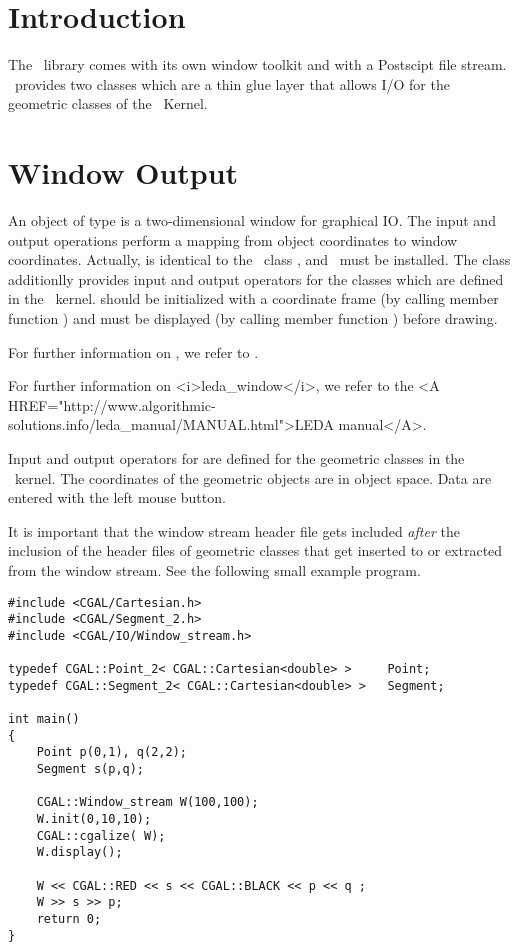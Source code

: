 \ccParDims

\section{Introduction}

The \leda\ library comes with its own window toolkit and with a
Postscipt file stream. \cgal\ provides two classes 
   
which  are a thin glue layer that allows I/O for the geometric 
classes of the \cgal\ Kernel.


\section{Window Output}

An object of type  is a two-dimensional window for
graphical IO. The input and output operations perform a mapping from
object coordinates to window coordinates.
Actually,  is identical to the \leda\ class ,
and \leda\ must be installed. The class additionlly provides input and output 
operators for the classes which are defined in the \cgal\ kernel.
 should be initialized with a coordinate frame 
(by calling member function
) and must be displayed (by calling member function ) before
drawing.

\begin{ccTexOnly}
For further information on , we refer to \cite{cgal:mnsu-lum}.
\end{ccTexOnly}
\begin{ccHtmlOnly}
For further information on <i>leda_window</i>, we refer to the 
<A HREF="http://www.algorithmic-solutions.info/leda_manual/MANUAL.html">LEDA manual</A>.
\end{ccHtmlOnly}

Input and output operators for  are defined for 
the geometric classes in the \cgal\ kernel.
The coordinates of the geometric objects are in object space. Data are
entered with the left mouse button.

It is important that the window stream header file gets included
{\em after} the inclusion of the header files of geometric classes
that get inserted to or extracted from the window stream. See the following 
small example program.

\begin{verbatim}
#include <CGAL/Cartesian.h>
#include <CGAL/Segment_2.h>
#include <CGAL/IO/Window_stream.h>

typedef CGAL::Point_2< CGAL::Cartesian<double> >     Point;
typedef CGAL::Segment_2< CGAL::Cartesian<double> >   Segment;

int main()
{
    Point p(0,1), q(2,2);
    Segment s(p,q);

    CGAL::Window_stream W(100,100);
    W.init(0,10,10);
    CGAL::cgalize( W);
    W.display();

    W << CGAL::RED << s << CGAL::BLACK << p << q ;
    W >> s >> p;
    return 0;
}
\end{verbatim} 

